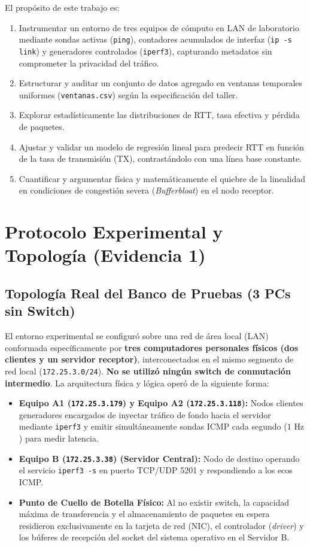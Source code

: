 \documentclass[10pt,twocolumn,letterpaper]{article}
\begin{document}
El propósito de este trabajo es:
\begin{enumerate}
    \item Instrumentar un entorno de tres equipos de cómputo en LAN de laboratorio mediante sondas activas (\texttt{ping}), contadores acumulados de interfaz (\texttt{ip -s link}) y generadores controlados (\texttt{iperf3}), capturando metadatos sin comprometer la privacidad del tráfico.
    \item Estructurar y auditar un conjunto de datos agregado en ventanas temporales uniformes (\texttt{ventanas.csv}) según la especificación del taller.
    \item Explorar estadísticamente las distribuciones de RTT, tasa efectiva y pérdida de paquetes.
    \item Ajustar y validar un modelo de regresión lineal para predecir RTT en función de la tasa de transmisión (TX), contrastándolo con una línea base constante.
    \item Cuantificar y argumentar física y matemáticamente el quiebre de la linealidad en condiciones de congestión severa (\textit{Bufferbloat}) en el nodo receptor.
\end{enumerate}

\section{Protocolo Experimental y Topología (Evidencia 1)}

\subsection{Topología Real del Banco de Pruebas (3 PCs sin Switch)}
El entorno experimental se configuró sobre una red de área local (LAN) conformada específicamente por \textbf{tres computadores personales físicos (dos clientes y un servidor receptor)}, interconectados en el mismo segmento de red local (\texttt{172.25.3.0/24}). \textbf{No se utilizó ningún switch de conmutación intermedio}. La arquitectura física y lógica operó de la siguiente forma:
\begin{itemize}
    \item \textbf{Equipo A1 (\texttt{172.25.3.179}) y Equipo A2 (\texttt{172.25.3.118}):} Nodos clientes generadores encargados de inyectar tráfico de fondo hacia el servidor mediante \texttt{iperf3} y emitir simultáneamente sondas ICMP cada segundo ($1\text{ Hz}$) para medir latencia.
    \item \textbf{Equipo B (\texttt{172.25.3.38}) (Servidor Central):} Nodo de destino operando el servicio \texttt{iperf3 -s} en puerto TCP/UDP 5201 y respondiendo a los ecos ICMP.
    \item \textbf{Punto de Cuello de Botella Físico:} Al no existir switch, la capacidad máxima de transferencia y el almacenamiento de paquetes en espera residieron exclusivamente en la tarjeta de red (NIC), el controlador (\textit{driver}) y los búferes de recepción del socket del sistema operativo en el Servidor B.
\end{itemize}
\end{document}
